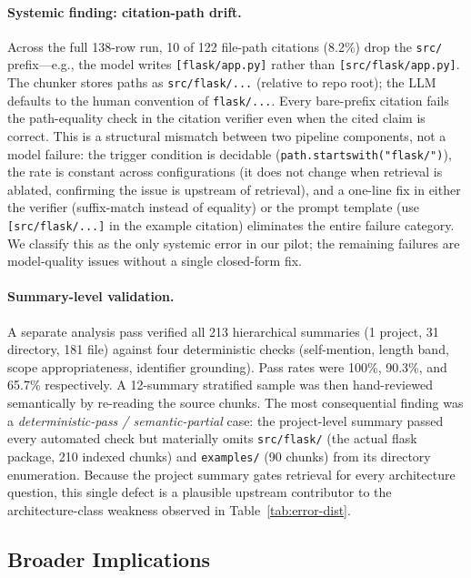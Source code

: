 \documentclass[11pt]{article}
\begin{document}
\paragraph{Systemic finding: citation-path drift.} Across the full 138-row run, 10 of 122 file-path citations (8.2\%) drop the \texttt{src/} prefix---e.g., the model writes \texttt{[flask/app.py]} rather than \texttt{[src/flask/app.py]}. The chunker stores paths as \texttt{src/flask/...} (relative to repo root); the LLM defaults to the human convention of \texttt{flask/...}. Every bare-prefix citation fails the path-equality check in the citation verifier even when the cited claim is correct. This is a structural mismatch between two pipeline components, not a model failure: the trigger condition is decidable (\texttt{path.startswith("flask/")}), the rate is constant across configurations (it does not change when retrieval is ablated, confirming the issue is upstream of retrieval), and a one-line fix in either the verifier (suffix-match instead of equality) or the prompt template (use \texttt{[src/flask/...]} in the example citation) eliminates the entire failure category. We classify this as the only systemic error in our pilot; the remaining failures are model-quality issues without a single closed-form fix.

\paragraph{Summary-level validation.} A separate analysis pass verified all 213 hierarchical summaries (1 project, 31 directory, 181 file) against four deterministic checks (self-mention, length band, scope appropriateness, identifier grounding). Pass rates were 100\%, 90.3\%, and 65.7\% respectively. A 12-summary stratified sample was then hand-reviewed semantically by re-reading the source chunks. The most consequential finding was a \emph{deterministic-pass / semantic-partial} case: the project-level summary passed every automated check but materially omits \texttt{src/flask/} (the actual flask package, 210 indexed chunks) and \texttt{examples/} (90 chunks) from its directory enumeration. Because the project summary gates retrieval for every architecture question, this single defect is a plausible upstream contributor to the architecture-class weakness observed in Table~\ref{tab:error-dist}.

\subsection{Broader Implications}
\end{document}
